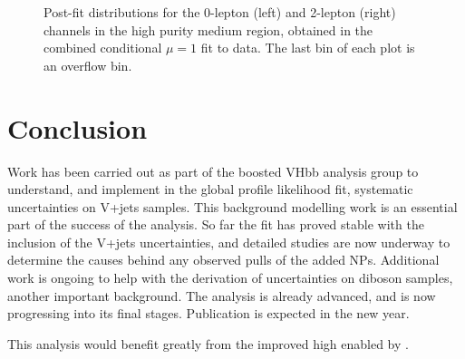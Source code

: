 \begin{figure}[!htbp]
\begin{subfigure}{.4\textwidth}
  \end{subfigure}
  \caption{
    Post-fit distributions for the 0-lepton (left) and 2-lepton (right) channels in the high purity medium \pTV region, obtained in the combined conditional $\mu=1$ fit to data. The last bin of each plot is an overflow bin.
  }
  \label{fig:vhbb postfit plots}
\end{figure}





\section{Conclusion}

Work has been carried out as part of the boosted VHbb analysis group to understand, and implement in the global profile likelihood fit, systematic uncertainties on V+jets samples. This background modelling work is an essential part of the success of the analysis. So far the fit has proved stable with the inclusion of the V+jets uncertainties, and detailed studies are now underway to determine the causes behind any observed pulls of the added NPs. Additional work is ongoing to help with the derivation of uncertainties on diboson samples, another important background. The analysis is already advanced, and is now progressing into its final stages. Publication is expected in the new year.

This analysis would benefit greatly from the improved high \pt \btagging enabled by \GNN.
